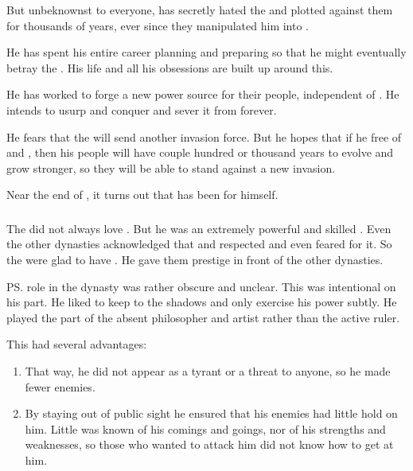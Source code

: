 But unbeknownst to everyone, \Azraid{} has secretly hated the \banelords{} and plotted against them for thousands of years, ever since they manipulated him into . 

He has spent his entire career planning and preparing so that he might eventually betray the \banes. 
His life and all his obsessions are built up around this. 

He has worked to forge a new power source for their people, independent of \Erebos. 
He intends to usurp and conquer \Nyx{} and sever it from \Erebos{} forever. 

He fears that the \banes{} will send another invasion force. 
But he hopes that if he free \Miith{} of \Iquin{} and \Daggerrain, then his people will have couple hundred or thousand years to evolve and grow stronger, so they will be able to stand against a new invasion. 

Near the end of \SentinelsofMiithEmph, it turns out that \Azraid{} has been  for himself.





\subsubsection{\CiriathSepher}
The \CiriathSepher did not always love \Azraid.
But he was an extremely powerful and skilled \sathariah. 
Even the other dynasties acknowledged that and respected and even feared \Azraid for it.
So the \CiriathSepher were glad to have \Azraid.
He gave them prestige in front of the other dynasties.

\ps{\Azraid} role in the dynasty was rather obscure and unclear. 
This was intentional on his part. 
He liked to keep to the shadows and only exercise his power subtly. 
He played the part of the absent philosopher and artist rather than the active ruler. 

This had several advantages:

\begin{enumerate}
  \item 
    That way, he did not appear as a tyrant or a threat to anyone, so he made fewer enemies. 
  \item 
    By staying out of public sight he ensured that his enemies had little hold on him. 
    Little was known of his comings and goings, nor of his strengths and weaknesses, so those who wanted to attack him did not know how to get at him. 
\end{enumerate}


